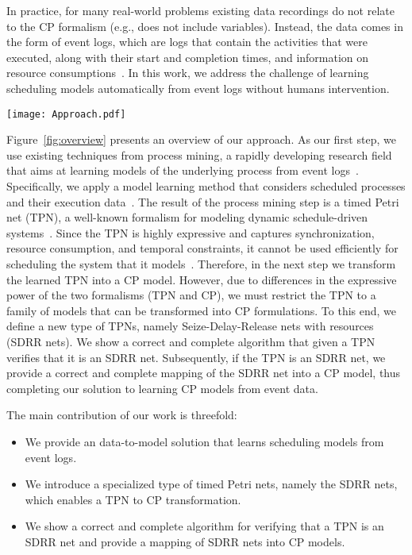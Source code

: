 In practice, for many real-world problems
existing data recordings do not 
relate to the CP formalism (e.g., does
not include variables). Instead, the data comes in the form of 
event logs,
which are logs that contain the activities that 
were executed, along with their 
start and completion times,
and 
information on resource consumptions~\cite[Chapter 4]{AalstBook}.
In this work, we address the challenge of learning 
scheduling models 
automatically from event logs without humans intervention.
 \begin{figure*}[t!]
	\centering
	\texttt{[image: Approach.pdf]}
	\vspace{-0.5em}
	\caption{Our solution to learning scheduling models.}
	\label{fig:overview}
\end{figure*}
Figure~\ref{fig:overview} presents an overview of our approach.
As our first step, we use existing techniques from process mining,
a rapidly developing
research field that aims at learning models
of the underlying process 
from event logs~\cite{AalstBook}. Specifically,
we apply a model learning method
that considers scheduled processes and their execution data~\cite{SenderovichRGMM15}. The result of the 
process mining step is a 
timed Petri net (TPN), a well-known formalism
for modeling dynamic schedule-driven systems~\cite{van1996petri}.
Since the TPN is highly expressive and 
captures synchronization, resource consumption, and temporal constraints, it cannot be used efficiently 
for scheduling the system that it models~\cite{van1996petri}. 
Therefore, in the next step we transform the learned 
TPN into a CP model. 
However, due to differences in the expressive power
of the two formalisms (TPN and CP), we must 
restrict the TPN to a family of models that can be 
transformed into CP formulations. To this end, we define a 
new type of TPNs, namely Seize-Delay-Release nets with resources (SDRR nets). We show a correct and complete algorithm that given a TPN verifies that it is an SDRR net. Subsequently, if the 
TPN is an SDRR net, we provide a 
correct and complete mapping of the SDRR net into a CP model,
thus completing our solution to learning CP models from event data. 
 


The main contribution of our work is threefold: \begin{itemize}
\item We provide an data-to-model solution that learns scheduling models from event logs.
\item We introduce a specialized type of timed Petri nets, namely
the SDRR nets, which enables a TPN to CP transformation. 
\item We show a correct and complete algorithm for verifying
that a TPN is an SDRR net
and provide a mapping of SDRR nets into CP models.

\end{itemize}

